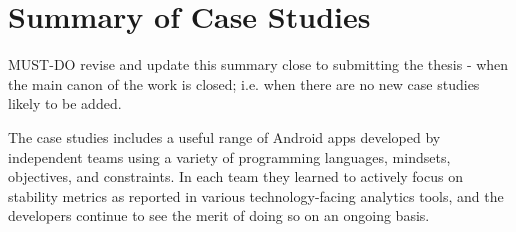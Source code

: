 
\newpage


\newpage


\newpage


\newpage


\newpage


\newpage


\newpage

\section{Summary of Case Studies}
MUST-DO revise and update this summary close to submitting the thesis - when the main canon of the work is closed; i.e. when there are no new case studies likely to be added.

The case studies includes a useful range of Android apps developed by independent teams using a variety of programming languages, mindsets, objectives, and constraints. In each team they learned to actively focus on stability metrics as reported in various technology-facing analytics tools, and the developers continue to see the merit of doing so on an ongoing basis.